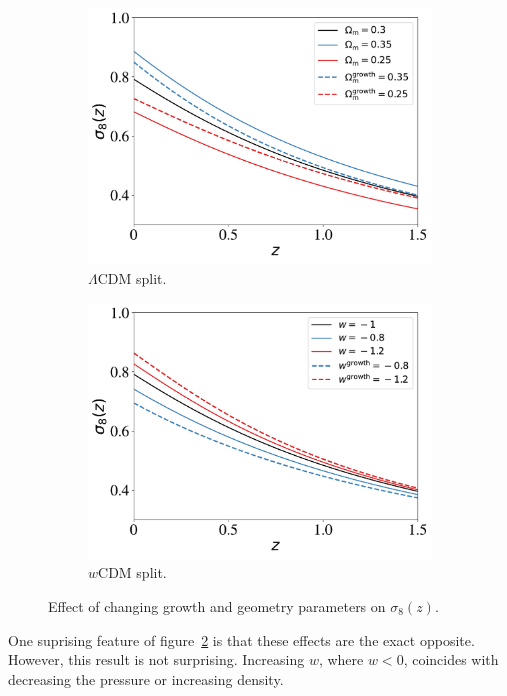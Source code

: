 \begin{figure}[ht]
	\centering
	\begin{subfigure}[b]{0.49\textwidth}
		\includegraphics[width=\textwidth]{plots/sigma8.pdf}
		\caption{$\Lambda$CDM split.}
		\label{fig:sigma8_l}
	\end{subfigure}
	\begin{subfigure}[b]{0.49\textwidth}
		\includegraphics[width=\textwidth]{plots/sigma8_w.pdf}
		\caption{$w$CDM split.}
		\label{fig:sigma8_w}
	\end{subfigure}
	\label{fig:sigma8}
	\caption{Effect of changing growth and geometry parameters on $\sigma_8(z)$.}
\end{figure}
One suprising feature of figure~\ref{fig:sigma8_w} is that these effects are the exact opposite. However, this result is not surprising. Increasing $w$, where $w<0$, coincides with decreasing the pressure or increasing density.
